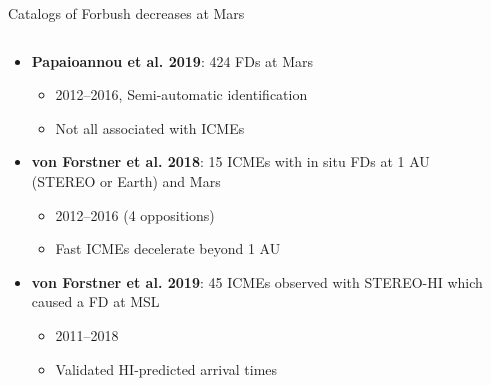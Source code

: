 \documentclass[10pt,aspectratio=169,usenames,dvipsnames]{beamer}
\begin{document}
\begin{frame}{Catalogs of Forbush decreases at Mars}
    \begin{columns}
    	\begin{column}{0.55\textwidth}
    		\begin{itemize}
                \item<1-> \textbf{Papaioannou et al. 2019}: 424 FDs at Mars
                    \begin{itemize}
                        \item 2012--2016, Semi-automatic identification
                        \item Not all associated with ICMEs
                    \end{itemize}
                \item<2-> \textbf{von Forstner et al. 2018}: 15 ICMEs with in situ FDs at 1 AU (STEREO or Earth) and Mars
                    \begin{itemize}
                        \item 2012--2016 (4 oppositions)
                        \item Fast ICMEs decelerate beyond 1 AU
                    \end{itemize}
    			\item<3-> \textbf{von Forstner et al. 2019}: 45 ICMEs observed with STEREO-HI which caused a FD at MSL
    				\begin{itemize}
                        \item 2011--2018
                        \item Validated HI-predicted arrival times
    				\end{itemize}
    		\end{itemize}
    	\end{column}
    	\begin{column}{0.35\textwidth}
            \centering
\end{column}
\end{columns}
\end{frame}
\end{document}
